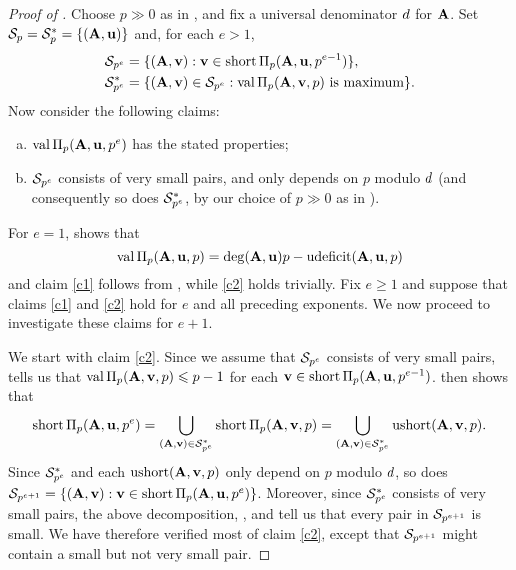 \documentclass{amsart}
\begin{document}
\begin{proof}[Proof of ]
   Choose $p \gg 0$ as in , and fix a universal denominator $\denom$ for $\matA$.
   Set $\S_p = \S^*_p = \{ (\matA,\vv{u}) \}$ and, for each $e > 1$,
   \begin{align*}
   \S_{p^{e}} &= \{ (\matA,\vv{v}):  \vv{v} \in \short \IP_p(\matA,\vv{u},p^{e-1}) \},\\
   \S^*_{p^{e}} &= \{ (\matA,\vv{v}) \in \S_{p^{e}}:  \val\IP_p(\matA,\vv{v},p)\text{ is maximum} \}.
   \end{align*}
   Now consider the following claims:
   \begin{enumerate}[(a),leftmargin=*]
      \item\label{c1} $\val \IP_p(\matA,\vv{u},p^e)$ has the stated properties;
      \item\label{c2} $\S_{p^e}$ consists of very small pairs, and only depends on $p$ modulo $\denom$ (and consequently so does $\S^*_{p^e}$, by our choice of $p\gg 0$ as in ).
   \end{enumerate}
   For $e=1$,  shows that
   \[ \val \IP_p(\matA,\vv{u},p) = \degree(\matA,\vv{u})p-\udeficit(\matA,\vv{u},p)\]
   and claim \ref{c1} follows from , while \ref{c2} holds trivially.
   Fix $e\ge 1$ and suppose that claims \ref{c1} and \ref{c2} hold for $e$ and all preceding exponents.
   We now proceed to investigate these claims for $e+1$.

   We start with claim \ref{c2}.
   Since we assume that $\S_{p^e}$ consists of very small pairs,  tells us that $\val\IP_p(\matA,\vv{v},p) \le p-1$ for each $\vv{v} \in \short \IP_p(\matA,\vv{u},p^{e-1})$.
    then shows that
   \[\short \IP_p(\matA,\vv{u},p^{e}) = \bigcup_{(\matA,\vv{v}) \in \S^*_{p^e}} \short \IP_p(\matA,\vv{v}, p)
      = \bigcup_{(\matA,\vv{v}) \in \S^*_{p^e}} \ushort(\matA,\vv{v}, p).\]
   Since $\S^*_{p^e}$ and each $\ushort(\matA,\vv{v}, p)$ only depend on $p$ modulo $\denom$, so does $\S_{p^{e+1}} = \{(\matA,\vv{v}): \vv{v}\in \short \IP_p(\matA,\vv{u},p^{e})\}$.
   Moreover, since $\S^*_{p^e}$ consists of very small pairs, the above decomposition, , and  tell us that every pair in $\S_{p^{e+1}}$ is small.
   We have therefore verified most of claim \ref{c2}, except that $\S_{p^{e+1}}$ might contain a small but not very small pair.


\end{proof}
\end{document}
